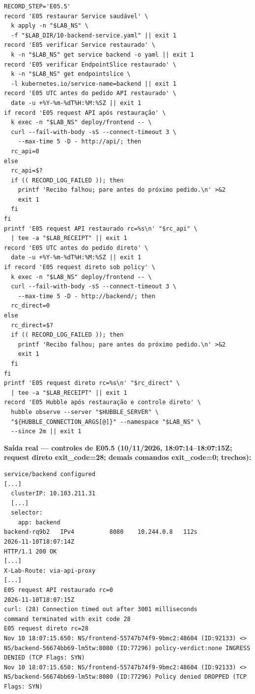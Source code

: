 \documentclass[12pt,openany,oneside,a4paper,chapter=TITLE,english,brazil]{abntex2}
\begin{document}
\begin{verbatim}
RECORD_STEP='E05.5'
record 'E05 restaurar Service saudável' \
  k apply -n "$LAB_NS" \
  -f "$LAB_DIR/10-backend-service.yaml" || exit 1
record 'E05 verificar Service restaurado' \
  k -n "$LAB_NS" get service backend -o yaml || exit 1
record 'E05 verificar EndpointSlice restaurado' \
  k -n "$LAB_NS" get endpointslice \
  -l kubernetes.io/service-name=backend || exit 1
record 'E05 UTC antes do pedido API restaurado' \
  date -u +%Y-%m-%dT%H:%M:%SZ || exit 1
if record 'E05 request API após restauração' \
  k exec -n "$LAB_NS" deploy/frontend -- \
  curl --fail-with-body -sS --connect-timeout 3 \
    --max-time 5 -D - http://api/; then
  rc_api=0
else
  rc_api=$?
  if (( RECORD_LOG_FAILED )); then
    printf 'Recibo falhou; pare antes do próximo pedido.\n' >&2
    exit 1
  fi
fi
printf 'E05 request API restaurado rc=%s\n' "$rc_api" \
  | tee -a "$LAB_RECEIPT" || exit 1
record 'E05 UTC antes do pedido direto' \
  date -u +%Y-%m-%dT%H:%M:%SZ || exit 1
if record 'E05 request direto sob policy' \
  k exec -n "$LAB_NS" deploy/frontend -- \
  curl --fail-with-body -sS --connect-timeout 3 \
    --max-time 5 -D - http://backend/; then
  rc_direct=0
else
  rc_direct=$?
  if (( RECORD_LOG_FAILED )); then
    printf 'Recibo falhou; pare antes do próximo pedido.\n' >&2
    exit 1
  fi
fi
printf 'E05 request direto rc=%s\n' "$rc_direct" \
  | tee -a "$LAB_RECEIPT" || exit 1
record 'E05 Hubble após restauração e controle direto' \
  hubble observe --server "$HUBBLE_SERVER" \
  "${HUBBLE_CONNECTION_ARGS[@]}" --namespace "$LAB_NS" \
  --since 2m || exit 1
\end{verbatim}

\textbf{Saída real --- controles de E05.5 (10/11/2026, 18:07:14--18:07:15Z; request direto exit\_code=28; demais comandos exit\_code=0; trechos):}

\begin{verbatim}
service/backend configured
[...]
  clusterIP: 10.103.211.31
  [...]
  selector:
    app: backend
backend-rq9b2   IPv4          8080    10.244.0.8   112s
2026-11-10T18:07:14Z
HTTP/1.1 200 OK
[...]
X-Lab-Route: via-api-proxy
[...]
E05 request API restaurado rc=0
2026-11-10T18:07:15Z
curl: (28) Connection timed out after 3001 milliseconds
command terminated with exit code 28
E05 request direto rc=28
Nov 10 18:07:15.650: NS/frontend-55747b74f9-9bmc2:48604 (ID:92133) <> NS/backend-56674bb69-lm5tw:8080 (ID:77296) policy-verdict:none INGRESS DENIED (TCP Flags: SYN)
Nov 10 18:07:15.650: NS/frontend-55747b74f9-9bmc2:48604 (ID:92133) <> NS/backend-56674bb69-lm5tw:8080 (ID:77296) Policy denied DROPPED (TCP Flags: SYN)
\end{verbatim}
\end{document}
